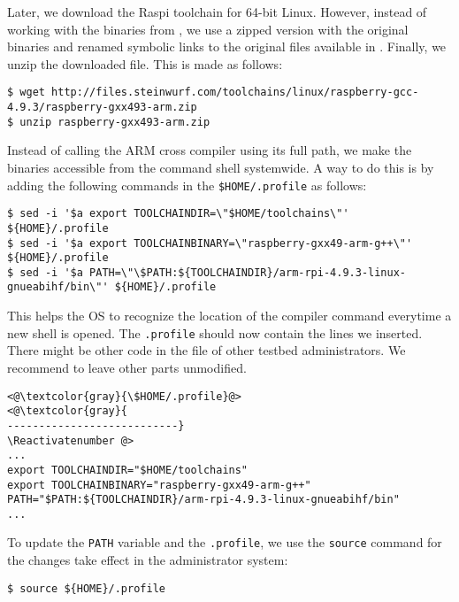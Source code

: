 Later, we download the \ac{Raspi} toolchain for 64-bit Linux. However,
instead of working with the binaries from \cite{2016rpitoolchain},
we use a zipped version with the original binaries and renamed symbolic
links to the original files available in
\cite{2016steinwurfrpitoolchain}. Finally, we unzip the downloaded file.
This is made as follows:

\begin{lstlisting}[]
$ wget http://files.steinwurf.com/toolchains/linux/raspberry-gcc-4.9.3/raspberry-gxx493-arm.zip
$ unzip raspberry-gxx493-arm.zip
\end{lstlisting}
\FloatBarrier
\vspace{-5mm}

Instead of calling the ARM cross compiler using its full path, we make
the binaries accessible from the command shell systemwide. A way to do
this is by adding the following commands in the \texttt{\${HOME}/.profile}
as follows:

\begin{lstlisting}[]
$ sed -i '$a export TOOLCHAINDIR=\"$HOME/toolchains\"' ${HOME}/.profile
$ sed -i '$a export TOOLCHAINBINARY=\"raspberry-gxx49-arm-g++\"' ${HOME}/.profile
$ sed -i '$a PATH=\"\$PATH:${TOOLCHAINDIR}/arm-rpi-4.9.3-linux-gnueabihf/bin\"' ${HOME}/.profile
\end{lstlisting}
\FloatBarrier
\vspace{-5mm}

This helps the \ac{OS} to recognize the location of the compiler
command everytime a new shell is opened. The \texttt{.profile} should now
contain the lines we inserted. There might be other
code in the file of other testbed administrators. We recommend to leave
other parts unmodified.
\Suppressnumber\begin{lstlisting}[]
<@\textcolor{gray}{\$HOME/.profile}@>
<@\textcolor{gray}{
---------------------------}
\Reactivatenumber @>
...
export TOOLCHAINDIR="$HOME/toolchains"
export TOOLCHAINBINARY="raspberry-gxx49-arm-g++"
PATH="$PATH:${TOOLCHAINDIR}/arm-rpi-4.9.3-linux-gnueabihf/bin"
...
\end{lstlisting}
\FloatBarrier
\vspace{-5mm}

To update the \texttt{PATH} variable and the \texttt{.profile}, we use the
\texttt{source} command for the changes take effect in the administrator
system:
\begin{lstlisting}[]
$ source ${HOME}/.profile
\end{lstlisting}
\FloatBarrier
\vspace{-5mm}

